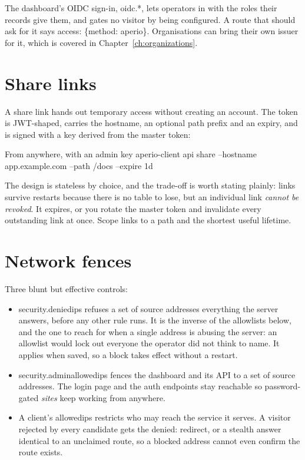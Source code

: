 \documentclass[11pt,a4paper,oneside]{book}
\newcommand{\aperiobreakableunderscore}{\textunderscore\allowbreak}
\newcommand{\aperiocodebreaks}{\XeTeXinterchartokenstate=1 }
\newcommand{\aperiocodebreaks}{}
\DeclareRobustCommand{\code}[1]{{\ttfamily\small\aperiocodebreaks
  \let\_\aperiobreakableunderscore#1}}
\begin{document}
The dashboard's OIDC sign-in, \code{oidc.*}, lets operators in with the
roles their records give them, and gates no visitor by being configured. A
route that should ask for it says \code{access: \{method: aperio\}}.
Organisations can bring their own issuer for it, which is covered in
Chapter~\ref{ch:organizations}.

\section{Share links}

A share link hands out temporary access without creating an account. The
token is JWT-shaped, carries the hostname, an optional path prefix and an
expiry, and is signed with a key derived from the master token:

\begin{codecard}[aperiosh]{From anywhere, with an admin key}
aperio-client api share --hostname app.example.com --path /docs --expire 1d
\end{codecard}

The design is stateless by choice, and the trade-off is worth stating
plainly: links survive restarts because there is no table to lose, but an
individual link \emph{cannot be revoked}. It expires, or you rotate the
master token and invalidate every outstanding link at once. Scope links
to a path and the shortest useful lifetime.

\section{Network fences}

Three blunt but effective controls:

\begin{itemize}[leftmargin=1.3em]
  \item \code{security.denied\_ips} refuses a set of source addresses
        everything the server answers, before any other rule runs. It is
        the inverse of the allowlists below, and the one to reach for when
        a single address is abusing the server: an allowlist would lock
        out everyone the operator did not think to name. It applies when
        saved, so a block takes effect without a restart.
  \item \code{security.admin\_allowed\_ips} fences the dashboard and its
        API to a set of source addresses. The login page and the auth
        endpoints stay reachable so password-gated \emph{sites} keep
        working from anywhere.
  \item A client's \code{allowed\_ips} restricts who may reach the
        service it serves. A visitor rejected by every candidate gets the
        \code{denied:} redirect, or a stealth answer identical to an
        unclaimed route, so a blocked address cannot even confirm the
        route exists.
\end{itemize}
\end{document}
